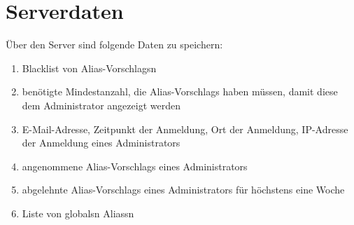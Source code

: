 \section{Serverdaten}

Über den \Gls{Server} sind folgende Daten zu speichern:
\begin{enumerate}[label=\textbf{/D\arabic*0/}, align=left]
	\setcounter{enumi}{\value{user_data_end}}
	\item Blacklist von \Glspl{Alias-Vorschlag}n
	\item benötigte Mindestanzahl, die \Glspl{Alias-Vorschlag} haben müssen, damit diese dem \Gls{Administrator} angezeigt werden
	\item E-Mail-Adresse, Zeitpunkt der Anmeldung, Ort der Anmeldung, IP-Adresse der Anmeldung eines \Gls{Administrator}s
	\item angenommene \Glspl{Alias-Vorschlag} eines \Gls{Administrator}s
	\item abgelehnte \Glspl{Alias-Vorschlag} eines \Gls{Administrator}s für höchstens eine Woche
	\item Liste von \glspl{global}n \Glspl{Alias}n
\end{enumerate}